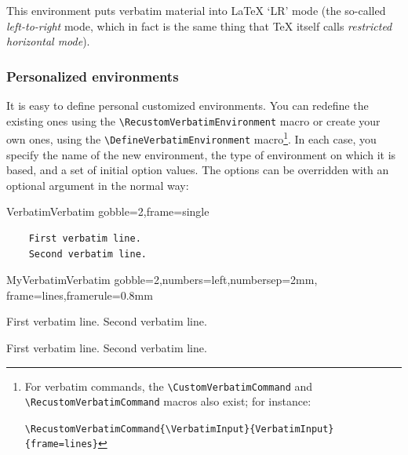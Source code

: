 \documentclass[twoside]{article}
\newif\ifChangeBar \ChangeBarfalse
\newcommand\cs[1]{\texttt{\textbackslash#1}}
\begin{document}
  This environment puts verbatim material into \LaTeX{} `LR' mode (the
so-called \emph{left-to-right} mode, which in fact is the same thing that
\TeX{} itself calls \emph{restricted horizontal mode}).

\subsubsection{Personalized environments}

\ifChangeBar\begin{changebar}\fi
\VerbatimFootnotes
  It is easy to define personal customized environments. You can redefine
the existing ones using the \cs{RecustomVerbatimEnvironment} macro or create
your own ones, using the \cs{DefineVerbatimEnvironment} macro\footnote{%
\ifChangeBar\begin{changebar}\fi
For verbatim commands, the \cs{CustomVerbatimCommand} and
\cs{RecustomVerbatimCommand} macros also exist; for instance:

\noindent
\verb+\RecustomVerbatimCommand{\VerbatimInput}{VerbatimInput}{frame=lines}+
\ifChangeBar\end{changebar}\fi}.
In each case, you specify the name of the new environment, the type of
environment on which it is based, and a set of initial option values. The
options can be overridden with an optional argument in the normal way:

\begin{SideBySideExample}
  \RecustomVerbatimEnvironment
    {Verbatim}{Verbatim}
    {gobble=2,frame=single}
  \begin{Verbatim}
    First verbatim line.
    Second verbatim line.
  \end{Verbatim}
\end{SideBySideExample}
\ifChangeBar\end{changebar}\fi

\begin{SideBySideExample}
  \DefineVerbatimEnvironment%
    {MyVerbatim}{Verbatim}
    {gobble=2,numbers=left,numbersep=2mm,
     frame=lines,framerule=0.8mm}
  \begin{MyVerbatim}
    First verbatim line.
    Second verbatim line.
  \end{MyVerbatim}

  \begin{MyVerbatim}[numbers=none,
                     framerule=1pt]
    First verbatim line.
    Second verbatim line.
  \end{MyVerbatim}
\end{SideBySideExample}
\end{document}
